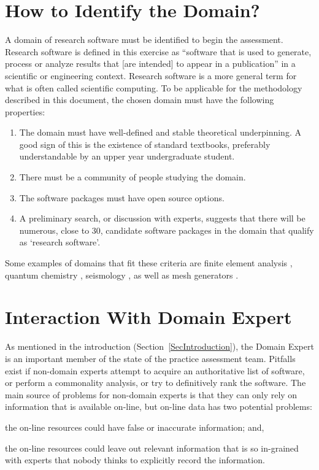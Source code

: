 \documentclass[letterpaper,cleveref]{lipics-v2019}
\begin{document}
\section{How to Identify the Domain?} \label{SecIdentifyDomain} 

A domain of research software must be identified to begin the assessment.
Research software is defined in this exercise as ``software that is used to
generate, process or analyze results that [are intended] to appear in a
publication'' \citep{hettrick2014uk} in a scientific or engineering context.
Research software is a more general term for what is often called scientific
computing.  To be applicable for the methodology described in this document, the
chosen domain must have the following properties:

\begin{enumerate}
\item The domain must have well-defined and stable theoretical underpinning.  A
  good sign of this is the existence of standard textbooks, preferably
  understandable by an upper year undergraduate student.
\item There must be a community of people studying the domain.
\item The software packages must have open source options.
\item A preliminary search, or discussion with experts, suggests that there will
  be numerous, close to 30, candidate software packages in the domain that
  qualify as `research software'.
\end{enumerate}	

Some examples of domains that fit these criteria are finite element analysis
\citep{szabo1996finite}, quantum chemistry \citep{veryazov20042molcas},
seismology \citep{SmithEtAl2018}, as well as mesh generators
\citep{smith2016state}.

\section{Interaction With Domain Expert} \label{SecDomainExpert} 

As mentioned in the introduction (Section~\ref{SecIntroduction}), the Domain
Expert is an important member of the state of the practice assessment team.
Pitfalls exist if non-domain experts attempt to acquire an authoritative list of
software, or perform a commonality analysis, or try to definitively rank the
software. The main source of problems for non-domain experts is that they can
only rely on information that is available on-line, but on-line data has two
potential problems:
\begin{inparaenum}[i)]
  \item the on-line resources could have false or inaccurate information; and,
  \item the on-line resources could leave out relevant information that is so
in-grained with experts that nobody thinks to explicitly record the information.
\end{inparaenum}
\end{document}
